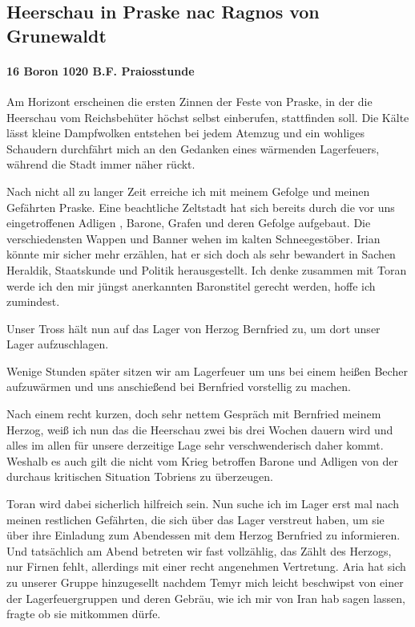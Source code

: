 \subsection{Heerschau in Praske nac Ragnos von Grunewaldt}

\paragraph{16 Boron 1020 B.F. Praiosstunde}
Am Horizont erscheinen die ersten Zinnen der Feste von Praske, in der die Heerschau vom Reichsbehüter höchst selbst einberufen, stattfinden soll. Die Kälte lässt kleine Dampfwolken entstehen bei jedem Atemzug und ein wohliges Schaudern durchfährt mich an den Gedanken eines wärmenden Lagerfeuers, während die Stadt immer näher rückt.

Nach nicht all zu langer Zeit erreiche ich mit meinem Gefolge und meinen Gefährten Praske. Eine beachtliche Zeltstadt hat sich bereits durch die vor uns eingetroffenen Adligen , Barone, Grafen und deren Gefolge aufgebaut. Die verschiedensten Wappen und Banner wehen im kalten Schneegestöber. Irian könnte mir sicher mehr erzählen, hat er sich doch als sehr bewandert in Sachen Heraldik, Staatskunde und Politik herausgestellt. Ich denke zusammen mit Toran werde ich den mir jüngst anerkannten Baronstitel gerecht werden, hoffe ich zumindest.

Unser Tross hält nun auf das Lager von Herzog Bernfried zu, um dort unser Lager aufzuschlagen.

Wenige Stunden später sitzen wir am Lagerfeuer um uns bei einem heißen Becher aufzuwärmen und uns anschießend bei Bernfried vorstellig zu machen.

Nach einem recht kurzen, doch sehr nettem Gespräch mit Bernfried meinem Herzog, weiß ich nun das die Heerschau zwei bis drei Wochen dauern wird und alles im allen für unsere derzeitige Lage sehr verschwenderisch daher kommt. Weshalb es auch gilt die nicht vom Krieg betroffen Barone und Adligen von der durchaus kritischen Situation Tobriens zu überzeugen.

Toran wird dabei sicherlich hilfreich sein. Nun suche ich im Lager erst mal nach meinen restlichen Gefährten, die sich über das Lager verstreut haben, um sie über ihre Einladung zum Abendessen mit dem Herzog Bernfried zu informieren. Und tatsächlich am Abend betreten wir fast vollzählig, das Zählt des Herzogs, nur Firnen fehlt, allerdings mit einer recht angenehmen Vertretung. Aria hat sich zu unserer Gruppe hinzugesellt nachdem Temyr mich leicht beschwipst von einer der Lagerfeuergruppen und deren Gebräu, wie ich mir von Iran hab sagen lassen, fragte ob sie mitkommen dürfe.

